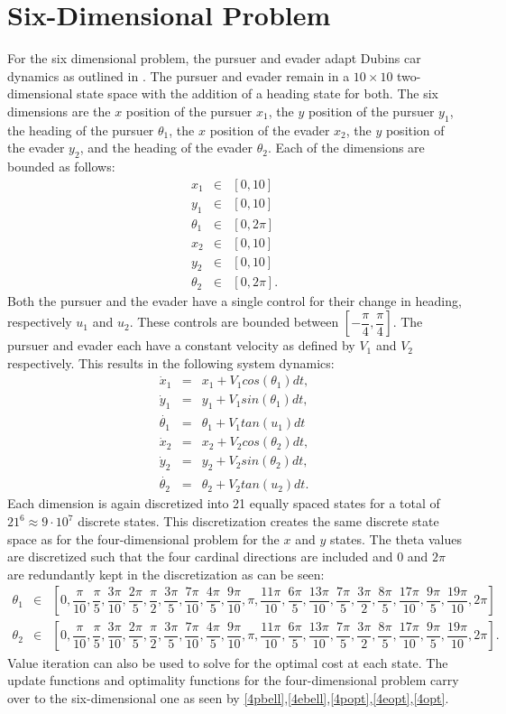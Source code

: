 \section{Six-Dimensional Problem}
For the six dimensional problem, the pursuer and evader adapt Dubins car dynamics as outlined in \cite{dubins}.  The pursuer and evader remain in a $10 \times 10$ two-dimensional  state space with the addition of a heading state for both. The six dimensions are the $x$ position of the pursuer $x_1$, the $y$ position of the pursuer $y_1$, the heading of the pursuer $\theta_1$, the $x$ position of the evader $x_2$, the $y$ position of the evader $y_2$, and the heading of the evader $\theta_2$. Each of the dimensions are bounded as follows:
\begin{eqnarray*}
x_1 & \in & [0,10]\\
y_1 & \in & [0,10]\\
\theta_1 & \in & [0,2\pi]\\
x_2 & \in & [0,10]\\
y_2 & \in & [0,10]\\
\theta_2 & \in & [0,2\pi].
\end{eqnarray*} 
Both the pursuer and the evader have a single control for their change in heading, respectively $u_1$ and $u_2$. These controls are bounded between $[-\dfrac{\pi}{4},\dfrac{\pi}{4}]$. The pursuer and evader each have a constant velocity as defined by $V_1$ and $V_2$ respectively. This results in the following system dynamics:
\begin{eqnarray}\label{eqns2}
\dot{x}_1 & = & x_1 +V_1cos(\theta_1)dt,\\
\dot{y}_1 & = & y_1 +V_1sin(\theta_1)dt,\\
\dot{\theta_1}  & = & \theta_1 + V_1tan(u_1)dt\\
\dot{x}_2 & = & x_2 +V_2cos(\theta_2)dt,\\
\dot{y}_2 & = & y_2 +V_2sin(\theta_2)dt,\\
\dot{\theta_2}  & = & \theta_2 + V_2tan(u_2)dt.
\end{eqnarray}
Each dimension is again discretized into 21 equally spaced states for a total of $21^6 \approx 9\cdot10^7$ discrete states. This discretization creates the same discrete state space as for the four-dimensional problem for the $x$ and $y$ states. The theta values are discretized such that the four cardinal directions are included and $0$ and $2\pi$ are redundantly kept in the discretization as can be seen:
\begin{eqnarray*}
\theta_1 & \in & [0,\dfrac{\pi}{10},\dfrac{\pi}{5},\dfrac{3\pi}{10},\dfrac{2\pi}{5},\dfrac{\pi}{2},\dfrac{3\pi}{5},\dfrac{7\pi}{10},\dfrac{4\pi}{5},\dfrac{9\pi}{10},\pi,\dfrac{11\pi}{10},\dfrac{6\pi}{5},\dfrac{13\pi}{10},\dfrac{7\pi}{5},\dfrac{3\pi}{2},\dfrac{8\pi}{5},\dfrac{17\pi}{10},\dfrac{9\pi}{5},\dfrac{19\pi}{10},2\pi]\\
\theta_2 & \in & [0,\dfrac{\pi}{10},\dfrac{\pi}{5},\dfrac{3\pi}{10},\dfrac{2\pi}{5},\dfrac{\pi}{2},\dfrac{3\pi}{5},\dfrac{7\pi}{10},\dfrac{4\pi}{5},\dfrac{9\pi}{10},\pi,\dfrac{11\pi}{10},\dfrac{6\pi}{5},\dfrac{13\pi}{10},\dfrac{7\pi}{5},\dfrac{3\pi}{2},\dfrac{8\pi}{5},\dfrac{17\pi}{10},\dfrac{9\pi}{5},\dfrac{19\pi}{10},2\pi].
\end{eqnarray*} 
Value iteration can also be used to solve for the optimal cost at each state. The update functions and optimality functions for the four-dimensional problem carry over to the six-dimensional one as seen by \ref{4pbell},\ref{4ebell},\ref{4popt},\ref{4eopt},\ref{4opt}.

